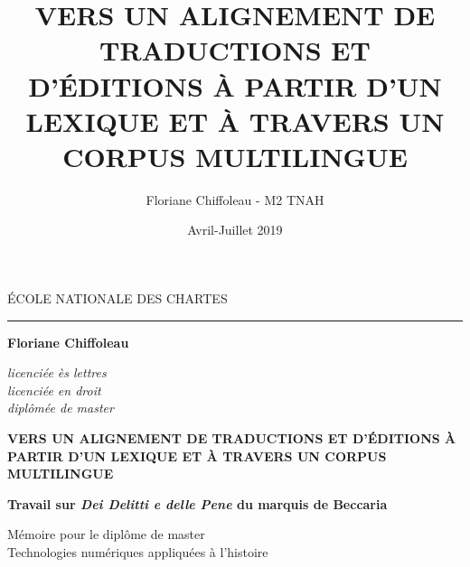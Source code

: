 \documentclass[a4paper,12pt, twoside]{book}
\title{VERS UN ALIGNEMENT DE TRADUCTIONS ET D'ÉDITIONS À PARTIR D'UN LEXIQUE ET À TRAVERS UN CORPUS MULTILINGUE}
\author{Floriane Chiffoleau - M2 TNAH}
\date{Avril-Juillet 2019}
\begin{document}
\frontmatter
{}
\begin{titlepage}
		\begin{center}
			
			\bigskip
			
			\begin{large}
				\'ECOLE NATIONALE DES CHARTES
			\end{large}
			\begin{center}\rule{2cm}{0.02cm}\end{center}
			
			\bigskip
			\bigskip
			\bigskip
			\begin{Large}
				\textbf{Floriane Chiffoleau}\\
			\end{Large}
			\begin{normalsize} \textit{licenciée ès lettres}\\
			    \textit{licenciée en droit}\\
				\textit{diplômée de master}
			\end{normalsize}
			
			\bigskip
			\bigskip
			\bigskip
			
			\begin{Huge}
				\textbf{VERS UN ALIGNEMENT DE TRADUCTIONS ET D'ÉDITIONS À PARTIR D'UN LEXIQUE ET À TRAVERS UN CORPUS MULTILINGUE}\\
			\end{Huge}
			\bigskip
			\bigskip
			\begin{LARGE}
				\textbf{Travail sur \emph{Dei Delitti e delle Pene} du marquis de Beccaria}\\
			\end{LARGE}
			
			\bigskip
			\bigskip
			\bigskip
			\begin{large}
			\end{large}
			\vfill
			
			\begin{large}
				Mémoire 
				pour le diplôme de master \\
				\og{} Technologies numériques appliquées à l'histoire \fg{} \\
			\end{large}
			
		\end{center}
	\end{titlepage}
\end{document}
